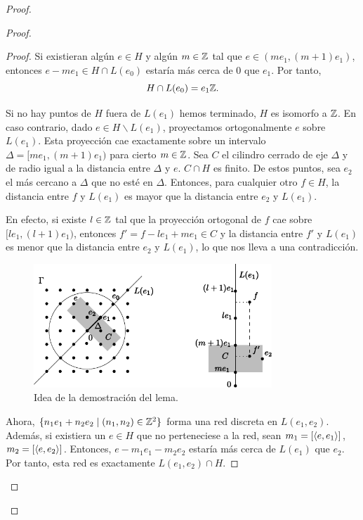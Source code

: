 \begin{proof}
\begin{proof}
\begin{proof}
  Si existieran algún $e \in H$ y algún $m \in \mathbb{Z}$ tal que $e \in (me_1,(m+1)e_1)$, entonces $e-me_1 \in H \cap L(e_0)$ estaría más cerca de 0 que $e_1$. Por tanto, 
  \[
    H\cap L(e_0) = e_1\mathbb{Z}.
  \]

  Si no hay puntos de $H$ fuera de $L(e_1)$ hemos terminado, $H$ es isomorfo a $\mathbb{Z}$. En caso contrario, dado $e \in H \backslash L(e_1)$, proyectamos ortogonalmente $e$ sobre $L(e_1)$. Esta proyección cae exactamente sobre un intervalo $\Delta=[me_1,(m+1)e_1)$ para cierto $m \in \mathbb{Z}$. Sea $C$ el cilindro cerrado de eje $\Delta$ y de radio igual a la distancia entre $\Delta$ y $e$. $C\cap H$ es finito. De estos puntos, sea $e_2$ el más cercano a $\Delta$ que no esté en $\Delta$. Entonces, para cualquier otro $f \in H$, la distancia entre $f$ y $L(e_1)$ es mayor que la distancia entre $e_2$ y $L(e_1)$. 
    
    En efecto, si existe $l \in \mathbb{Z}$ tal que la proyección ortogonal de $f$ cae sobre $[le_1,(l+1)e_1)$, entonces $f'=f-le_1+me_1 \in C$ y la distancia entre $f'$ y $L(e_1)$ es menor que la distancia entre $e_2$ y $L(e_1)$, lo que nos lleva a una contradicción.

  \begin{figure}[h]
    \centering
    \includegraphics[width=0.8\textwidth]{pics/grupo}
    \caption{\small Idea de la demostración del lema.}
    \label{fig:grupo}
  \end{figure}

      Ahora, $\{n_1e_1+n_2e_2 \mid (n_1,n_2) \in \mathbb{Z}^2 \}$ forma una red discreta en $L(e_1,e_2)$. Además, si existiera un $e\in H$ que no perteneciese a la red, sean $m_1=[\left\langle e,e_1\right\rangle]$, $m_2=[\left\langle e,e_2\right\rangle]$. Entonces, $e-m_1e_1-m_2e_2$ estaría más cerca de $L(e_1)$ que $e_2$. Por tanto, esta red es exactamente $L(e_1,e_2) \cap H$.


\end{proof}
\end{proof}
\end{proof}

